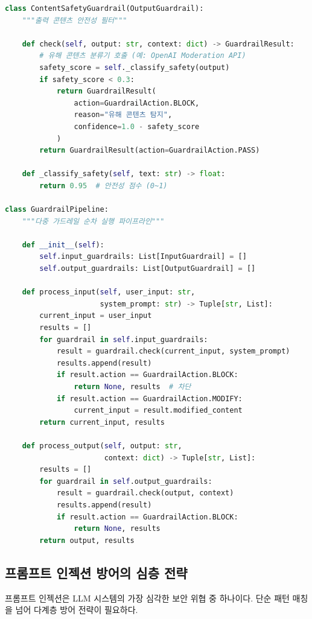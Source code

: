 \begin{lstlisting}[language=Python, caption={LLM 가드레일 구현 프레임워크}, label={lst:llm_guardrails}]
class ContentSafetyGuardrail(OutputGuardrail):
    """출력 콘텐츠 안전성 필터"""

    def check(self, output: str, context: dict) -> GuardrailResult:
        # 유해 콘텐츠 분류기 호출 (예: OpenAI Moderation API)
        safety_score = self._classify_safety(output)
        if safety_score < 0.3:
            return GuardrailResult(
                action=GuardrailAction.BLOCK,
                reason="유해 콘텐츠 탐지",
                confidence=1.0 - safety_score
            )
        return GuardrailResult(action=GuardrailAction.PASS)

    def _classify_safety(self, text: str) -> float:
        return 0.95  # 안전성 점수 (0~1)

class GuardrailPipeline:
    """다중 가드레일 순차 실행 파이프라인"""

    def __init__(self):
        self.input_guardrails: List[InputGuardrail] = []
        self.output_guardrails: List[OutputGuardrail] = []

    def process_input(self, user_input: str,
                      system_prompt: str) -> Tuple[str, List]:
        current_input = user_input
        results = []
        for guardrail in self.input_guardrails:
            result = guardrail.check(current_input, system_prompt)
            results.append(result)
            if result.action == GuardrailAction.BLOCK:
                return None, results  # 차단
            if result.action == GuardrailAction.MODIFY:
                current_input = result.modified_content
        return current_input, results

    def process_output(self, output: str,
                       context: dict) -> Tuple[str, List]:
        results = []
        for guardrail in self.output_guardrails:
            result = guardrail.check(output, context)
            results.append(result)
            if result.action == GuardrailAction.BLOCK:
                return None, results
        return output, results
\end{lstlisting}


\subsection{프롬프트 인젝션 방어의 심층 전략}
\label{sec:13.5.3}

프롬프트 인젝션은 LLM 시스템의 가장 심각한 보안 위협 중 하나이다. 단순 패턴 매칭을 넘어 다계층 방어 전략이 필요하다.

